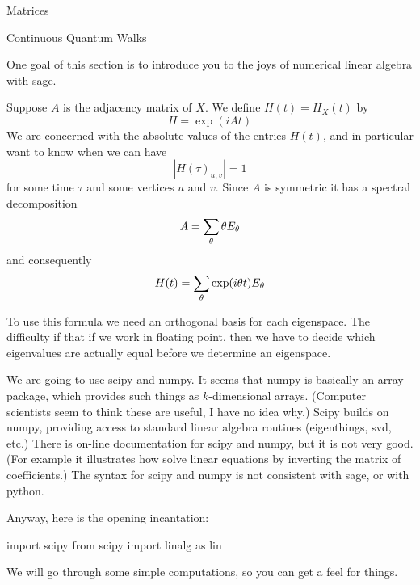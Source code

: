 \begin{chap}{Matrices}
%
\begin{sect}{Continuous Quantum Walks}
%
\begin{para}
One goal of this section is to introduce you to the joys of numerical linear
algebra with sage.
\end{para}
%
\begin{para}
Suppose $A$ is the adjacency matrix of $X$. We define $H(t)=H_X(t)$ by
\[
    H =\exp(iAt)
\]
We are concerned with the absolute values of the entries $H(t)$, and in particular
want to know when we can have
\[
    |H(\tau)_{u,v}| =1
\]
for some time $\tau$ and some vertices $u$ and $v$. Since $A$ is symmetric 
it has a spectral decomposition
\[
    A =\sum_\theta \theta E_\theta
\]
and consequently
\[
    H(t) = \sum_\theta \exp(i\theta t)E_\theta
\]
\end{para}
%
\begin{para}
To use this formula we need an orthogonal basis for each eigenspace.
The difficulty if that if we work in floating point, then we have
to decide which eigenvalues are actually equal before we determine
an eigenspace.
\end{para}
%
\begin{para}
We are going to use scipy and numpy. 
It seems that numpy is basically an array package, which 
provides such things as $k$-dimensional arrays. (Computer scientists seem
to think these are useful, I have no idea why.) Scipy builds on numpy, providing
access to standard linear algebra routines (eigenthings, svd, etc.)
There is on-line documentation for scipy and numpy, but it is not very good.
(For example it illustrates how solve linear equations by inverting the matrix 
of coefficients.) The syntax for scipy and numpy is not consistent with sage, or 
with python. 
\end{para}
%
\begin{para}
Anyway, here is the opening incantation:
\end{para}
%
\begin{sagecode}
\begin{sageinput}
import scipy
from scipy import linalg as lin
\end{sageinput}
\end{sagecode}
%
\begin{para}
We will go through some simple computations, so you can get a feel for things.
\end{para}
%
\begin{sagecode}
\begin{sageinput}

\end{sageinput}
\end{sagecode}
\end{sect}
\end{chap}
